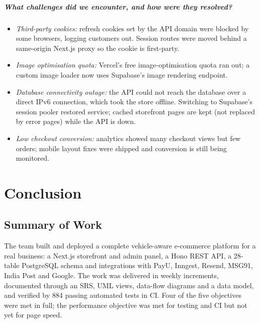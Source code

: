 \documentclass{tietreport}
\begin{document}
\paragraph{What challenges did we encounter, and how were they resolved?}
\begin{itemize}
  \item \emph{Third-party cookies:} refresh cookies set by the API domain were
        blocked by some browsers, logging customers out. Session routes were
        moved behind a same-origin Next.js proxy so the cookie is first-party.
  \item \emph{Image optimisation quota:} Vercel's free image-optimisation
        quota ran out; a custom image loader now uses Supabase's image
        rendering endpoint.
  \item \emph{Database connectivity outage:} the API could not reach the
        database over a direct IPv6 connection, which took the store offline.
        Switching to Supabase's session pooler restored service; cached
        storefront pages are kept (not replaced by error pages) while the API is down.
  \item \emph{Low checkout conversion:} analytics showed many checkout views
        but few orders; mobile layout fixes were shipped and conversion is still
        being monitored.
\end{itemize}

\chapter{Conclusion}

\section{Summary of Work}

The team built and deployed a complete vehicle-aware e-commerce platform for
a real business: a Next.js storefront and admin panel, a Hono REST API, a
28-table PostgreSQL schema and integrations with PayU, Inngest, Resend,
MSG91, India Post and Google. The work was delivered in weekly increments,
documented through an SRS, UML views, data-flow diagrams and a data model,
and verified by 884 passing automated tests in CI. Four of the five objectives
were met in full; the performance objective was met for testing and CI but not
yet for page speed.
\end{document}
